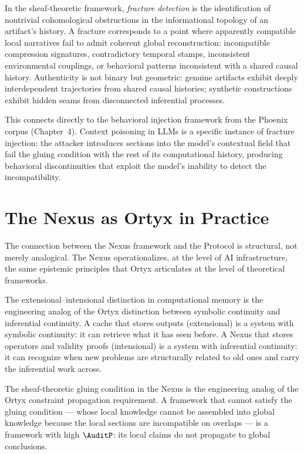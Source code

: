 \begin{auditprop}
\label{ap:fracture-cohomology}
In the sheaf-theoretic framework, \emph{fracture
detection} is the identification of nontrivial
cohomological obstructions in the informational
topology of an artifact's history. A fracture
corresponds to a point where apparently compatible
local narratives fail to admit coherent global
reconstruction: incompatible compression signatures,
contradictory temporal stamps, inconsistent environmental
couplings, or behavioral patterns inconsistent with
a shared causal history. Authenticity is not binary
but geometric: genuine artifacts exhibit deeply
interdependent trajectories from shared causal histories;
synthetic constructions exhibit hidden seams from
disconnected inferential processes.
\end{auditprop}

This connects directly to the behavioral injection
framework from the Phoenix corpus (Chapter~4). Context
poisoning in LLMs is a specific instance of fracture
injection: the attacker introduces sections into the
model's contextual field that fail the gluing condition
with the rest of its computational history, producing
behavioral discontinuities that exploit the model's
inability to detect the incompatibility.

\section{The Nexus as Ortyx in Practice}
\label{sec:nexus-ortyx}

The connection between the Nexus framework and the
\Ortyx{} Protocol is structural, not merely analogical.
The Nexus operationalizes, at the level of AI infrastructure,
the same epistemic principles that Ortyx articulates
at the level of theoretical frameworks.

The extensional--intensional distinction in computational
memory is the engineering analog of the Ortyx distinction
between symbolic continuity and inferential continuity.
A cache that stores outputs (extensional) is a system
with symbolic continuity: it can retrieve what it has
seen before. A Nexus that stores operators and validity
proofs (intensional) is a system with inferential
continuity: it can recognize when new problems are
structurally related to old ones and carry the
inferential work across.

The sheaf-theoretic gluing condition in the Nexus
is the engineering analog of the Ortyx constraint
propagation requirement. A framework that cannot
satisfy the gluing condition --- whose local knowledge
cannot be assembled into global knowledge because
the local sections are incompatible on overlaps ---
is a framework with high $\AuditP$: its local claims
do not propagate to global conclusions.

